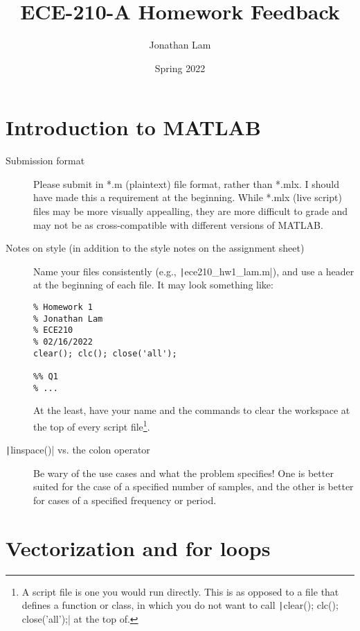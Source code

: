 \documentclass{article}
\title{ECE-210-A Homework Feedback}
\author{Jonathan Lam}
\date{Spring 2022}
\begin{document}
\maketitle{}

\section{Introduction to MATLAB}
\label{sec:hw1}

\begin{description}
\item[Submission format] Please submit in *.m (plaintext) file format, rather than *.mlx. I should have made this a requirement at the beginning. While *.mlx (live script) files may be more visually appealling, they are more difficult to grade and may not be as cross-compatible with different versions of MATLAB.
\item[Notes on style (in addition to the style notes on the assignment sheet)] Name your files consistently (e.g., \texttt|ece210_hw1_lam.m|), and use a header at the beginning of each file. It may look something like:
\begin{verbatim}
% Homework 1
% Jonathan Lam
% ECE210
% 02/16/2022
clear(); clc(); close('all');

%% Q1
% ...
\end{verbatim}
  At the least, have your name and the commands to clear the workspace at the top of every script file\footnote{A script file is one you would run directly. This is as opposed to a file that defines a function or class, in which you do not want to call \texttt|clear(); clc(); close('all');| at the top of.}.
  \item[\texttt|linspace()| vs. the colon operator] Be wary of the use cases and what the problem specifies! One is better suited for the case of a specified number of samples, and the other is better for cases of a specified frequency or period.
\end{description}

\clearpage{}
\section{Vectorization and for loops}
\label{sec:hw2}
\end{document}
